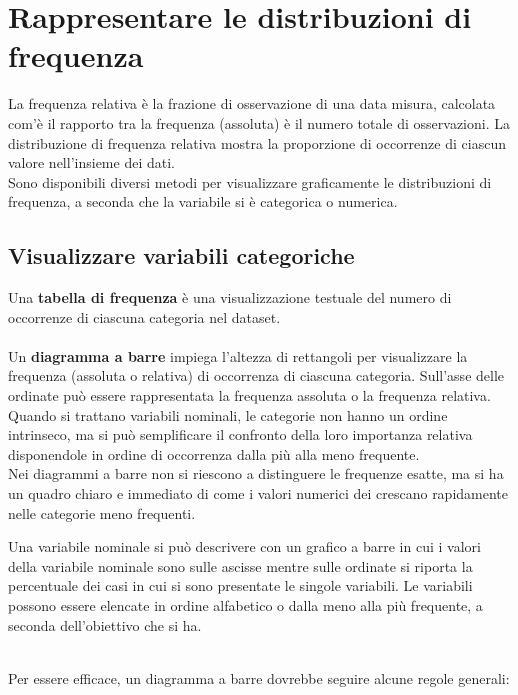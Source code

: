 \documentclass[10pt, draft]{book}
\begin{document}
\section{Rappresentare le distribuzioni di frequenza}
La frequenza relativa è la frazione di osservazione di una data misura, calcolata com'è il rapporto tra la frequenza (assoluta) è il numero totale di osservazioni. La distribuzione di frequenza relativa mostra la proporzione di occorrenze di ciascun valore nell'insieme dei dati.
\\
Sono disponibili diversi metodi per visualizzare graficamente le distribuzioni di frequenza, a seconda che la variabile si è categorica o numerica.

\subsection{Visualizzare variabili categoriche}
Una \textbf{tabella di frequenza} è una visualizzazione testuale del numero di occorrenze di ciascuna categoria nel dataset.
\\
\\
Un \textbf{diagramma a barre} impiega l'altezza di rettangoli per visualizzare la frequenza (assoluta o relativa) di occorrenza di ciascuna categoria. Sull'asse delle ordinate può essere rappresentata la frequenza assoluta o la frequenza relativa.
\\
Quando si trattano variabili nominali, le categorie non hanno un ordine intrinseco, ma si può semplificare il confronto della loro importanza relativa disponendole in ordine di occorrenza dalla più alla meno frequente.
\\
Nei diagrammi a barre non si riescono a distinguere le frequenze esatte, ma si ha un quadro chiaro e immediato di come i valori numerici dei crescano rapidamente nelle categorie meno frequenti. 
\\
\colorbox{lyellow}{\parbox{0.98\textwidth}{Una variabile nominale si può descrivere con un grafico a barre in cui i valori della variabile nominale sono sulle ascisse mentre sulle ordinate si riporta la percentuale dei casi in cui si sono presentate le singole variabili. Le variabili possono essere elencate in ordine alfabetico o dalla meno alla più frequente, a seconda dell'obiettivo che si ha.}}
\\
Per essere efficace, un diagramma a barre dovrebbe seguire alcune regole generali:
\end{document}
